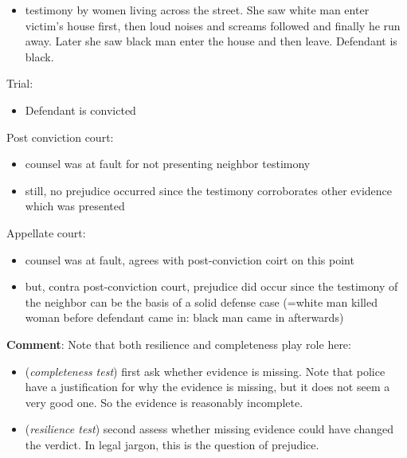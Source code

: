 \documentclass[
  10pt,
  dvipsnames,enabledeprecatedfontcommands]{scrartcl}
\providecommand{\tightlist}{%
  \setlength{\itemsep}{0pt}\setlength{\parskip}{0pt}}
\begin{document}
\begin{itemize}
\tightlist
\item
  testimony by women living across the street. She saw white man enter
  victim's house first, then loud noises and screams followed and
  finally he run away. Later she saw black man enter the house and then
  leave. Defendant is black.
\end{itemize}

Trial:

\begin{itemize}
\tightlist
\item
  Defendant is convicted
\end{itemize}

Post conviction court:

\begin{itemize}
\item
  counsel was at fault for not presenting neighbor testimony
\item
  still, no prejudice occurred since the testimony corroborates other
  evidence which was presented
\end{itemize}

Appellate court:

\begin{itemize}
\item
  counsel was at fault, agrees with post-conviction coirt on this point
\item
  but, contra post-conviction court, prejudice did occur since the
  testimony of the neighbor can be the basis of a solid defense case
  (=white man killed woman before defendant came in: black man came in
  afterwards)
\end{itemize}

\textbf{Comment}: Note that both resilience and completeness play role
here:

\begin{itemize}
\item
  (\emph{completeness test}) first ask whether evidence is missing. Note
  that police have a justification for why the evidence is missing, but
  it does not seem a very good one. So the evidence is reasonably
  incomplete.
\item
  (\emph{resilience test}) second assess whether missing evidence could
  have changed the verdict. In legal jargon, this is the question of
  prejudice.
\end{itemize}

\end{document}
